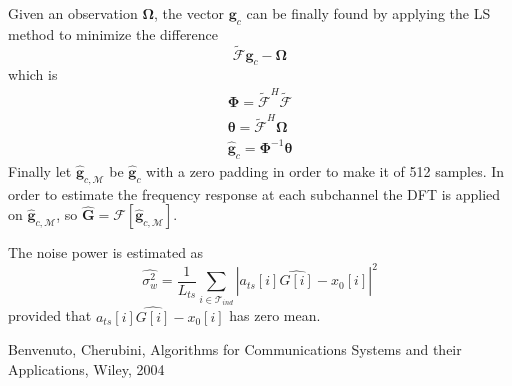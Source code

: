 \documentclass[10pt]{article}
\newcommand{\ofdM} {\mathcal{M}}
\begin{document}
Given an observation $\boldsymbol{\Omega}$, the vector $\mathbf{g}_{c}$ can be finally found by applying the LS method to minimize the difference
\begin{equation}
	\boldsymbol{\tilde{\mathcal{F}}}\mathbf{g}_{c} - \boldsymbol{\Omega}
\end{equation}
which is
\begin{eqnarray}
	\boldsymbol{\Phi} = \boldsymbol{\tilde{\mathcal{F}}}^H \boldsymbol{\tilde{\mathcal{F}}} \\
	\boldsymbol{\theta} = \boldsymbol{\tilde{\mathcal{F}}}^H \boldsymbol{\Omega} \\ 
	\hat{\mathbf{g}}_{c} = \boldsymbol{\Phi}^{-1} \boldsymbol{\theta} 
\end{eqnarray}
Finally let $\hat{\mathbf{g}}_{c, \ofdM}$ be $\hat{\mathbf{g}}_{c}$ with a zero padding in order to make it of 512 samples. In order to estimate the frequency response at each subchannel the DFT is applied on $\hat{\mathbf{g}}_{c, \ofdM}$, so $\hat{\mathbf{G}} = \mathcal{F}[\hat{\mathbf{g}}_{c, \ofdM}]$. 

The noise power is estimated as 
\begin{equation}
	\hat{\sigma_w^2} = \frac{1}{L_{ts}} \sum_{i \in \mathcal{T}_{ind}} |a_{ts}[i]\hat{G[i]} - x_0[i]|^2
\end{equation}
provided that $a_{ts}[i]\hat{G[i]} - x_0[i]$ has zero mean.

\begin{thebibliography}{10}

Benvenuto, Cherubini, Algorithms for Communications Systems and their Applications, Wiley, 2004

\end{thebibliography}
\end{document}
